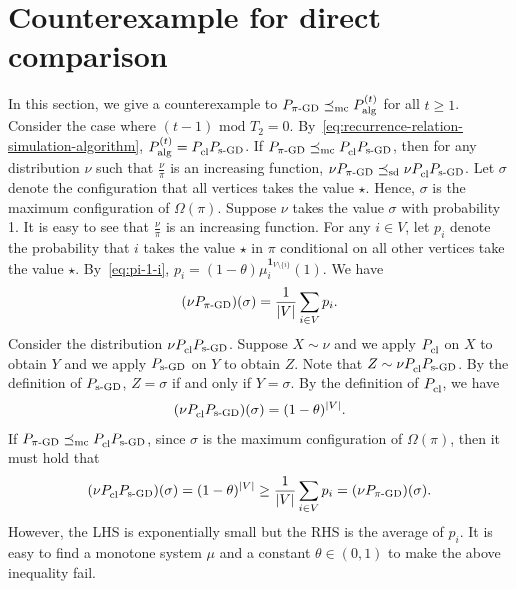 \documentclass[11pt,a4paper]{article}
\newcommand{\mc}{\preceq_{\textnormal{mc}}}
\newcommand{\sd}{\preceq_{\textnormal{sd}}}
\newcommand{\psim}{P_{\textnormal{s-GD}}}
\theoremstyle{definition}
\def\*#1{\mathbf{#1}} %
\begin{document}
\section{Counterexample for direct comparison}\label{sec:counterexample}
In this section, we give a counterexample to $P_{\pi\textnormal{-GD}} \mc P_{\textnormal{alg}}^{(t)}$ for all $t \geq 1$. 
Consider the case where $(t-1) \text{ mod } T_2 = 0$. By~\eqref{eq:recurrence-relation-simulation-algorithm}, $P^{(t)}_{\textnormal{alg}} = P^{}_{\textnormal{cl}} \psim $. If $P_{\pi\textnormal{-GD}} \mc P^{}_{\textnormal{cl}} \psim $, then for any distribution $\nu$ such that $\frac{\nu}{\pi}$ is an increasing function,  $\nu P_{\pi\textnormal{-GD}} \sd \nu P^{}_{\textnormal{cl}} \psim $. Let $\sigma$ denote the configuration that all vertices takes the value $\star$. Hence, $\sigma$ is the maximum configuration of $\Omega(\pi)$. Suppose $\nu$ takes the value $\sigma$ with probability 1. It is easy to see that $\frac{\nu}{\pi}$ is an increasing function. For any $i \in V$, let $p_i$ denote the probability that $i$ takes the value $\star$ in $\pi$ conditional on all other vertices take the value $\star$. By~\eqref{eq:pi-1-i}, $p_i = (1-\theta)\mu_i^{\*1_{V \setminus \{i\}}}(1)$.
We have 
\begin{align*}
    (\nu P_{\pi\textnormal{-GD}})(\sigma) = \frac{1}{|V|}\sum_{i \in V} p_i.  
\end{align*}
Consider the distribution $\nu P^{}_{\textnormal{cl}} \psim$. Suppose $X \sim \nu$ and we apply $P^{}_{\textnormal{cl}}$ on $X$ to obtain $Y$ and we apply $\psim$ on $Y$ to obtain $Z$. Note that $Z \sim \nu P^{}_{\textnormal{cl}} \psim$. By the definition of $\psim$, $Z = \sigma$ if and only if $Y = \sigma$. By the definition of $P^{}_{\textnormal{cl}}$, we have 
\begin{align*}
    (\nu P^{}_{\textnormal{cl}} \psim)(\sigma) = (1-\theta)^{|V|}. 
\end{align*}
If $P_{\pi\textnormal{-GD}} \mc P^{}_{\textnormal{cl}} \psim $, since $\sigma$ is the maximum configuration of $\Omega(\pi)$, then it must hold that 
\begin{align*}
    (\nu P^{}_{\textnormal{cl}} \psim)(\sigma) = (1-\theta)^{|V|} \geq \frac{1}{|V|}\sum_{i \in V} p_i = (\nu P_{\pi\textnormal{-GD}})(\sigma).
\end{align*}
However, the LHS is exponentially small but the RHS is the average of $p_i$. It is easy to find a monotone system $\mu$ and a constant $\theta \in (0,1)$ to make the above inequality fail.
\end{document}
